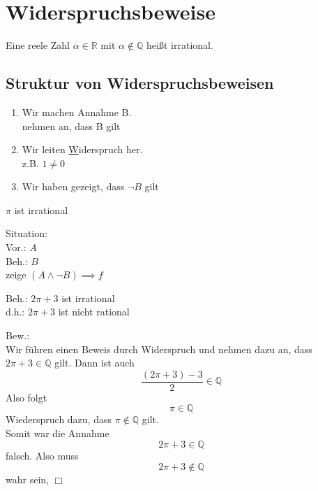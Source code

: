 \documentclass[a4paper, parskip = true, fleqn, headsepline = true]{scrartcl}
\DeclareRobustCommand{\qed}{%
	\ifmmode \tag*{$\Box$}%
	\else \leavevmode\unskip\penalty9999 \hbox{}\nobreak\hfill\quad\hbox{$\Box$}%
	\fi%
}
\begin{document}
\section{Widerspruchsbeweise}
\begin{definition}
	\label{def:IrrationaleZahlen}
	Eine reele Zahl $ \alpha \in \mathbb{R} $ mit $ \alpha \notin \mathbb{Q} $ heißt irrational.
\end{definition}

\subsection{Struktur von Widerspruchsbeweisen}
\begin{enumerate}
	\item Wir machen Annahme B.\\
		nehmen an, dass B gilt
	\item Wir leiten \underline Widerspruch her.\\
		z.B. $ 1 \neq 0 $\\
	\item Wir haben gezeigt, dass $ \neg B $ gilt
\end{enumerate}

\begin{subtheorem}
	\label{theorem:PiIstIrrational}
	$ \pi $ ist irrational
\end{subtheorem}
\begin{subproof}
	Situation:\\
	Vor.: $A$ \\
	Beh.: $B$ \\
	zeige $ ( A \wedge \neg B ) \implies f $\par
	Beh.: $ 2 \pi + 3 $ ist irrational\\
	d.h.: $ 2 \pi + 3 $ ist nicht rational\par
	Bew.:\\
	Wir führen einen Beweis durch Widerspruch und nehmen dazu an, dass $ 2 \pi + 3 \in \mathbb{Q} $ gilt. Dann ist auch
	\[ \frac{ ( 2 \pi + 3 ) - 3 }{ 2 } \in \mathbb{Q} \]
	Also folgt
	\[ \pi \in \mathbb{Q} \]
	Wiederspruch dazu, dass $ \pi \notin \mathbb{Q} $ gilt.\\
	Somit war die Annahme
	\[ 2 \pi + 3 \in \mathbb{Q} \]
	falsch. Also muss
	\[ 2 \pi + 3 \notin \mathbb{Q} \]
	wahr sein, \qed
\end{subproof}
\end{document}
